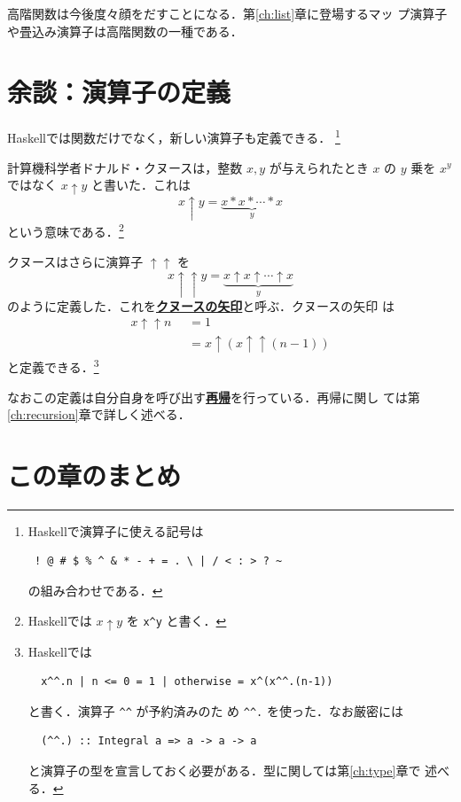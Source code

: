 \documentclass[a5paper,twoside,fleqn,draft]{jsbook}
\newcommand{\programminglanguage}[1]{\textsf{#1}}
\newcommand{\haskell}{\programminglanguage{Haskell}}
\newcommand{\keyword}[1]{{\underline{\textbf{#1}}}}
\newcommand{\code}[1]{\texttt{#1}}
\newcommand{\mKeyword}[1]{\mathsf{#1}} %
\newcommand{\mOtherwiseKeyword}{\mKeyword{otherwise}}
\DeclareMathOperator{\mOtherwise}{\mOtherwiseKeyword}
\newcommand{\mGuard}[1]{\mathop{\mid_{#1}}}
\begin{document}
高階関数は今後度々顔をだすことになる．第\ref{ch:list}章に登場するマッ
プ演算子や畳込み演算子は高階関数の一種である．

\section{余談：演算子の定義}

\haskell では関数だけでなく，新しい演算子も定義できる．
\footnote{\haskell で演算子に使える記号は
\begin{verbatim}
 ! @ # $ % ^ & * - + = . \ | / < : > ? ~
\end{verbatim}%
の組み合わせである．}


計算機科学者ドナルド・クヌースは，整数 $x,y$ が与えられたとき $x$ の
$y$ 乗を $x^y$ ではなく $x\uparrow y$ と書いた．これは
\begin{equation}
x\uparrow y=\underbrace{x*x*\dotsb*x}_{y}
\end{equation}
という意味である．\footnote{\haskell では $x\uparrow y$ を
  \code{x\textasciicircum y} と書く．}

クヌースはさらに演算子 $\uparrow\uparrow$ を
\begin{equation}
  x\uparrow\uparrow y =\underbrace{x\uparrow x\uparrow\dotsb\uparrow
  x}_{y}
\end{equation}
のように定義した．これを\keyword{クヌースの矢印}と呼ぶ．クヌースの矢印
は
\begin{align}
x\uparrow\uparrow
n&\mGuard{n\le0}=1\\ &\mGuard{\mOtherwise}=x\uparrow(x\uparrow\uparrow(n-1))
\end{align}
と定義できる．\footnote{\haskell では
\begin{verbatim}
  x^^.n | n <= 0 = 1 | otherwise = x^(x^^.(n-1))
\end{verbatim}
と書く．演算子 \code{\textasciicircum\textasciicircum} が予約済みのた
め \code{\textasciicircum\textasciicircum.} を使った．なお厳密には
\begin{verbatim}
  (^^.) :: Integral a => a -> a -> a
\end{verbatim}
と演算子の型を宣言しておく必要がある．型に関しては第\ref{ch:type}章で
述べる．}

なおこの定義は自分自身を呼び出す\keyword{再帰}を行っている．再帰に関し
ては第\ref{ch:recursion}章で詳しく述べる．

\section{この章のまとめ}
\end{document}
